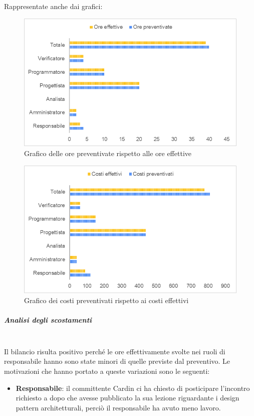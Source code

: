 Rappresentate anche dai grafici:
\begin{figure} [H]
	\includegraphics[width=\linewidth]{./img/Grafici/35.png}
	\caption{Grafico delle ore preventivate rispetto alle ore effettive}
\end{figure}

\begin{figure} [H]
	\includegraphics[width=\linewidth]{./img/Grafici/36.png}
	\caption{Grafico dei costi preventivati rispetto ai costi effettivi}
\end{figure}

\subparagraph*{Analisi degli scostamenti} \mbox{} \\
Il bilancio risulta positivo perché le ore effettivamente svolte nei ruoli di responsabile hanno sono state minori di quelle previste dal preventivo.
Le motivazioni che hanno portato a queste variazioni sono le seguenti:
\begin{itemize}
	\item \textbf{Responsabile}: il committente Cardin ci ha chiesto di posticipare l'incontro richiesto a dopo che avesse pubblicato la sua lezione riguardante i design pattern architetturali, perciò il responsabile ha avuto meno lavoro.
\end{itemize}

